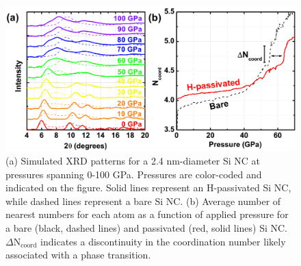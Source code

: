 \begin{figure}
\begin{center}
\includegraphics[width=\textwidth]{./chapter7/md1.png}
\caption[Comparison of simulated XRD and coordination number for bare and H-passivated Si NCs.]{(a) Simulated XRD patterns for a 2.4 nm-diameter Si NC at pressures spanning 0-100 GPa. Pressures are color-coded and indicated on the figure. Solid lines represent an H-passivated Si NC, while dashed lines represent a bare Si NC. (b) Average number of nearest numbers for each atom as a function of applied pressure for a bare (black, dashed lines) and passivated (red, solid lines) Si NC. $\Delta$N$_{\mathrm{coord}}$ indicates a discontinuity in the coordination number likely associated with a phase transition.}
\label{f:md1}
\end{center}
\end{figure}

